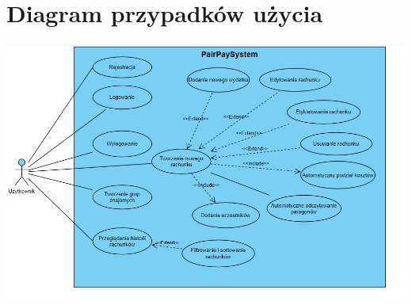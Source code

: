 \documentclass[12pt,titlepage]{article}
\begin{document}
\newpage

\section{Diagram przypadków użycia}
\includegraphics[width=1\textwidth]{UserDiagram.png}
\end{document}
